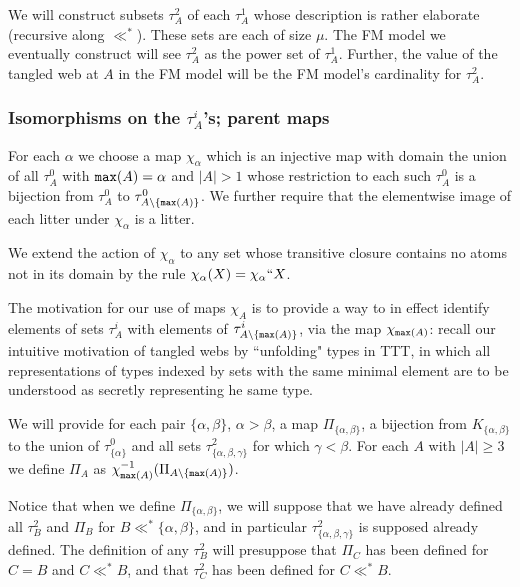 \documentclass[12pt]{article}
\begin{document}
We will construct subsets $\tau^2_A$ of each $\tau^1_A$ whose description is rather elaborate (recursive along $\ll^*$).  These sets are each of size $\mu$.  The FM model we eventually
construct will see $\tau^2_A$ as the power set of $\tau^1_A$.  Further, the value of the tangled web at $A$ in the FM model will be the FM model's cardinality for $\tau^2_A$.

\newpage

\subsubsection{Isomorphisms on the $\tau^i_A$'s;  parent maps}

For each $\alpha$ we choose a map $\chi_\alpha$ which is an injective map with domain the union of all $\tau^0_A$ with ${\tt max}(A)=\alpha$ and $|A|>1$ whose restriction
to each such $\tau^0_A$ is a bijection from $\tau^0_A$ to $\tau^0_{A\setminus \{{\tt max}(A)\}}$.  We further require that the elementwise image of each litter under $\chi_\alpha$ is a litter.



We extend the action of $\chi_\alpha$ to any set whose transitive closure contains no atoms not in its domain by the rule $\chi_\alpha(X) = \chi_\alpha``X$.

The motivation for our use of maps $\chi_A$ is to provide a way to in effect identify elements of sets $\tau^i_A$ with elements of $\tau^i_{A \setminus \{{\tt max}(A)\}}$, via the
map $\chi_{{\tt max}(A)}$:  recall our intuitive motivation of tangled webs by ``unfolding" types in TTT, in which all representations of types indexed by sets with the same minimal element are to be understood as secretly representing he same type.

We will provide for each pair $\{\alpha,\beta\}$, $\alpha>\beta$, a map $\Pi_{\{\alpha,\beta\}}$, a bijection from $K_{\{\alpha,\beta\}}$ to the union of
$\tau^0_{\{\alpha\}}$ and all sets $\tau^2_{\{\alpha,\beta,\gamma\}}$ for which $\gamma<\beta$.  For each $A$ with $|A|\geq 3$ we define $\Pi_A$ as $\chi_{{\tt max}(A)}^{-1}(\Pi_{A \setminus \{{\tt max}(A)\}})$.  

Notice that when we define $\Pi_{\{\alpha,\beta\}}$, we will suppose that we have already defined all $\tau^2_B$ and $\Pi_B$ for $B \ll^* \{\alpha,\beta\}$,
and in particular $\tau^2_{\{\alpha,\beta,\gamma\}}$ is supposed already defined.  The definition of any $\tau^2_B$ will presuppose that $\Pi_C$ has been defined
for $C=B$ and $C \ll^* B$, and that $\tau^2_C$ has been defined for $C \ll^* B$.
\end{document}
